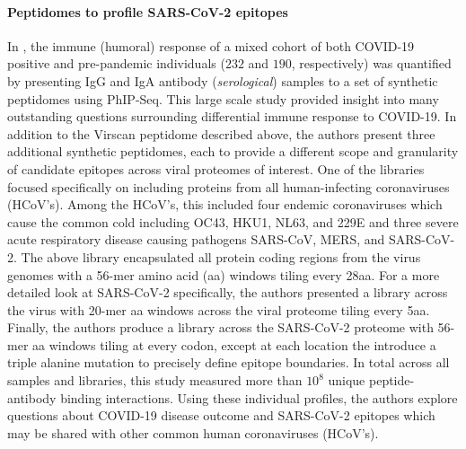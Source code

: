 \documentclass{article}
\begin{document}
\paragraph{Peptidomes to profile SARS-CoV-2 epitopes}
In \citet{Shrock2020}, the immune (humoral) response of a mixed cohort of both COVID-19 positive and pre-pandemic individuals ($232$ and $190$, respectively) was quantified by presenting IgG and IgA antibody (\textit{serological}) samples to a set of synthetic peptidomes using PhIP-Seq.
This large scale study provided insight into many outstanding questions surrounding differential immune response to COVID-19.
In addition to the Virscan peptidome described above, the authors present three additional synthetic peptidomes, each to provide a different scope and granularity of candidate epitopes across viral proteomes of interest.
One of the libraries focused specifically on including proteins from all human-infecting coronaviruses (HCoV's).
Among the HCoV's, this included four endemic coronaviruses which cause the common cold including OC43, HKU1, NL63, and 229E and three severe acute respiratory disease causing pathogens SARS-CoV, MERS, and SARS-CoV-2.
The above library encapsulated all protein coding regions from the virus genomes with a 56-mer amino acid (aa) windows tiling every 28aa.
For a more detailed look at SARS-CoV-2 specifically, the authors presented a library across the virus with 20-mer aa windows across the viral proteome tiling every 5aa.
Finally, the authors produce a library across the SARS-CoV-2 proteome with 56-mer aa windows tiling at every codon, except at each location the introduce a triple alanine mutation to precisely define epitope boundaries.
In total across all samples and libraries, this study measured more than $10^{8}$ unique peptide-antibody binding interactions.
Using these individual profiles, the authors explore questions about COVID-19 disease outcome and SARS-CoV-2 epitopes which may be shared with other common human coronaviruses (HCoV's).
\end{document}
